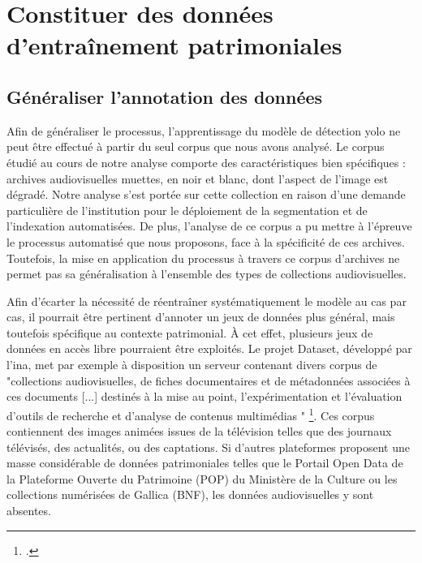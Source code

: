 \section{\label{III_3_B} Constituer des données d'entraînement patrimoniales} 

\subsection{Généraliser l'annotation des données}
Afin de généraliser le processus, l'apprentissage du modèle de détection \gls{yolo} ne peut être effectué à partir du seul corpus que nous avons analysé. Le corpus étudié au cours de notre analyse comporte des caractéristiques bien spécifiques : archives audiovisuelles muettes, en noir et blanc, dont l'aspect de l'image est dégradé. Notre analyse s'est portée sur cette collection en raison d'une demande particulière de l'institution pour le déploiement de la segmentation et de l'indexation automatisées. De plus, l'analyse de ce corpus a pu mettre à l'épreuve le processus automatisé que nous proposons, face à la spécificité de ces archives. Toutefois, la mise en application du processus à travers ce corpus d'archives ne permet pas sa généralisation à l'ensemble des types de collections audiovisuelles. 

Afin d'écarter la nécessité de réentraîner systématiquement le modèle au cas par cas, il pourrait être pertinent d'annoter un jeux de données plus général, mais toutefois spécifique au contexte patrimonial. À cet effet, plusieurs jeux de données en accès libre pourraient être exploités. Le projet Dataset, développé par l'\gls{ina}, met par exemple à disposition un serveur contenant divers corpus de "collections audiovisuelles, de fiches documentaires et de métadonnées associées à ces documents [...] destinés à la mise au point, l’expérimentation et l’évaluation d’outils de recherche et d’analyse de contenus multimédias " \footcite{zotero-item-754}. Ces corpus contiennent des images animées issues de la télévision telles que des journaux télévisés, des actualités, ou des captations. Si d'autres plateformes proposent une masse considérable de données patrimoniales telles que le Portail Open Data de la Plateforme Ouverte du Patrimoine (POP) du Ministère de la Culture ou les collections numérisées de Gallica (BNF), les données audiovisuelles y sont absentes. 

